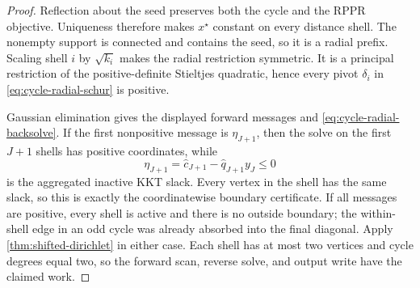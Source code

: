 \begin{proof}
Reflection about the seed preserves both the cycle and the RPPR objective.
Uniqueness therefore makes $x^\star$ constant on every distance shell.
The nonempty support is connected and contains the seed, so it is a radial
prefix.  Scaling shell $i$ by $\sqrt{k_i}$ makes the radial restriction
symmetric.  It is a principal restriction of the positive-definite
Stieltjes quadratic, hence every pivot $\delta_i$ in
\cref{eq:cycle-radial-schur} is positive.

Gaussian elimination gives the displayed forward messages and
\cref{eq:cycle-radial-backsolve}.  If the first nonpositive message is
$\eta_{J+1}$, then the solve on the first $J+1$ shells has positive
coordinates, while
\begin{equation*}
 \eta_{J+1}
 =\widehat c_{J+1}-\widehat q_{J+1}y_J\leq0
\end{equation*}
is the aggregated inactive KKT slack.  Every vertex in the shell has the
same slack, so this is exactly the coordinatewise boundary certificate.  If
all messages are positive, every shell is active and there is no outside
boundary; the within-shell edge in an odd cycle was already absorbed into
the final diagonal.  Apply \cref{thm:shifted-dirichlet} in either case.
Each shell has at most two vertices and cycle degrees equal two, so the
forward scan, reverse solve, and output write have the claimed work.
\end{proof}
